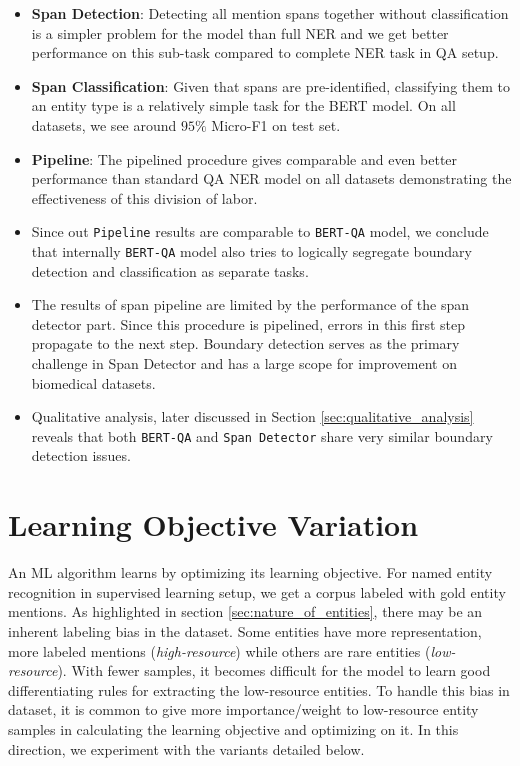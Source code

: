 \begin{itemize}
    \item \textbf{Span Detection}: Detecting all mention spans together without classification is a simpler problem for the model than full NER and we get better performance on this sub-task compared to complete NER task in QA setup.
    
    \item \textbf{Span Classification}: Given that spans are pre-identified, classifying them to an entity type is a relatively simple task for the BERT model. On all datasets, we see around $95\%$ Micro-F1 on test set.
    
    \item \textbf{Pipeline}: The pipelined procedure gives comparable and even better performance than standard QA NER model on all datasets demonstrating the effectiveness of this division of labor. 
    
    \item Since out \texttt{Pipeline} results are comparable to \texttt{BERT-QA} model, we conclude that internally \texttt{BERT-QA} model also tries to logically segregate boundary detection and classification as separate tasks.
    
    \item The results of span pipeline are limited by the performance of the span detector part. Since this procedure is pipelined, errors in this first step propagate to the next step. Boundary detection serves as the primary challenge in Span Detector and has a large scope for improvement on biomedical datasets.
    
    \item Qualitative analysis, later discussed in Section \ref{sec:qualitative_analysis} reveals that both \texttt{BERT-QA} and \texttt{Span Detector} share very similar boundary detection issues.
\end{itemize}

\section{Learning Objective Variation}
An ML algorithm learns by optimizing its learning objective. For named entity recognition in supervised learning setup, we get a corpus labeled with gold entity mentions. As highlighted in section \ref{sec:nature_of_entities}, there may be an inherent labeling bias in the dataset. Some entities have more representation, more labeled mentions (\textit{high-resource}) while others are rare entities (\textit{low-resource}). With fewer samples, it becomes difficult for the model to learn good differentiating rules for extracting the low-resource entities. To handle this bias in dataset, it is common to give more importance/weight to low-resource entity samples in calculating the learning objective and optimizing on it. In this direction, we experiment with the variants detailed below.


